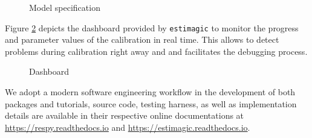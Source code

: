 \begin{figure}[h!]\centering
\caption{Model specification}\label{Model specification}
\hspace{0.3cm}
\end{figure}\FloatBarrier

\noindent Figure \ref{Dashboard} depicts the dashboard provided by \verb+estimagic+ to monitor the progress and parameter values of the calibration in real time. This allows to detect problems during calibration right away and and facilitates the debugging process.

\begin{figure}[h!]\centering
\caption{Dashboard}\label{Dashboard}
\end{figure}\FloatBarrier

\noindent We adopt a modern software engineering workflow in the development of both packages and tutorials, source code, testing harness, as well as implementation details are available in their respective online documentations at \url{https://respy.readthedocs.io} and \url{https://estimagic.readthedocs.io}.
